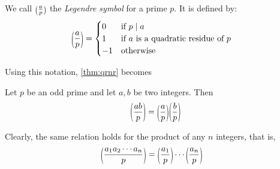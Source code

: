 \documentclass[main.tex]{subfile}
\begin{document}
	\begin{definition}
		We call $\parenthesis{\frac{a}{p}}$ the {\it Legendre symbol} for a prime $p$. It is defined by:
		\begin{align*}
			\parenthesis{\dfrac{a}{p}}
			& =
			\begin{cases}
				0 & \mbox{if }p\mid a\\
				1 &\mbox{if }a\mbox{ is a quadratic residue of }p\\
				-1 &\mbox{otherwise}
			\end{cases}
		\end{align*}

	\end{definition}

	Using this notation, \autoref{thm:qrnr} becomes
	\begin{theorem}\label{thm:qrproduct}
		Let $p$ be an odd prime and let $a,b$ be two integers. Then
		\begin{align*}
			\parenthesis{\dfrac{ab}{p}} = \parenthesis{\dfrac{a}{p}} \parenthesis{\dfrac{b}{p}}
		\end{align*}
	\end{theorem}

	\begin{remark}
		Clearly, the same relation holds for the product of any $n$ integers, that is,
		\begin{align*}
			\parenthesis{\dfrac{a_1a_2\cdots a_n}{p}}
				& = \parenthesis{\dfrac{a_1}{p}} \cdots \parenthesis{\dfrac{a_n}{p}}
		\end{align*}
	\end{remark}
\end{document}
